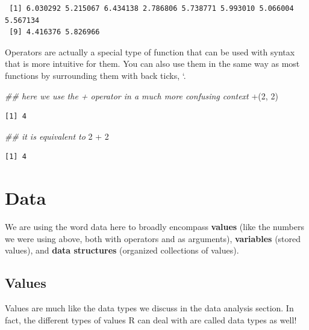 \documentclass[
  letterpaper,
  DIV=11,
  numbers=noendperiod]{scrreprt}
\newenvironment{Shaded}{\begin{snugshade}}{\end{snugshade}}
\newcommand{\AttributeTok}[1]{\textcolor[rgb]{0.40,0.45,0.13}{#1}}
\newcommand{\DecValTok}[1]{\textcolor[rgb]{0.68,0.00,0.00}{#1}}
\newcommand{\DocumentationTok}[1]{\textcolor[rgb]{0.37,0.37,0.37}{\textit{#1}}}
\newcommand{\NormalTok}[1]{\textcolor[rgb]{0.00,0.23,0.31}{#1}}
\newcommand{\SpecialCharTok}[1]{\textcolor[rgb]{0.37,0.37,0.37}{#1}}
\newcommand{\StringTok}[1]{\textcolor[rgb]{0.13,0.47,0.30}{#1}}
\begin{document}
\begin{verbatim}
 [1] 6.030292 5.215067 6.434138 2.786806 5.738771 5.993010 5.066004 5.567134
 [9] 4.416376 5.826966
\end{verbatim}

Operators are actually a special type of function that can be used with
syntax that is more intuitive for them. You can also use them in the
same way as most functions by surrounding them with back ticks, `.

\begin{Shaded}
\begin{Highlighting}[]
\DocumentationTok{\#\# here we use the + operator in a much more confusing context}
\StringTok{\textasciigrave{}}\AttributeTok{+}\StringTok{\textasciigrave{}}\NormalTok{(}\DecValTok{2}\NormalTok{, }\DecValTok{2}\NormalTok{)}
\end{Highlighting}
\end{Shaded}

\begin{verbatim}
[1] 4
\end{verbatim}

\begin{Shaded}
\begin{Highlighting}[]
\DocumentationTok{\#\# it is equivalent to}
\DecValTok{2} \SpecialCharTok{+} \DecValTok{2}
\end{Highlighting}
\end{Shaded}

\begin{verbatim}
[1] 4
\end{verbatim}

\hypertarget{data}{%
\section{Data}\label{data}}

We are using the word data here to broadly encompass \textbf{values}
(like the numbers we were using above, both with operators and as
arguments), \textbf{variables} (stored values), and \textbf{data
structures} (organized collections of values).

\hypertarget{values}{%
\subsection{Values}\label{values}}

Values are much like the data types we discuss in the data analysis
section. In fact, the different types of values R can deal with are
called data types as well!
\end{document}
